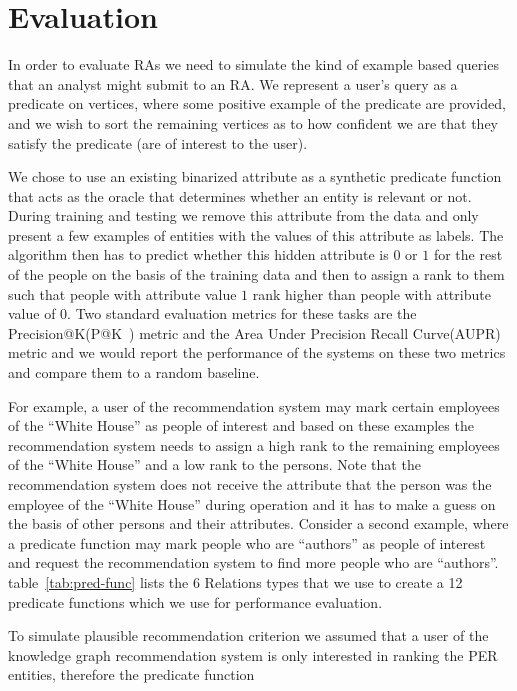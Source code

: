 \documentclass[paper=a4,fontsize=11pt]{scrartcl}
\makeatletter
\newcommand{\tabref}[1]{table~\ref{#1}}
\numberwithin{equation}{section}    %
\numberwithin{figure}{section}      %
\numberwithin{table}{section}       %
\newcommand{\PK}{P@K\ }
\makeatother
\begin{document}
\section{Evaluation}
\label{sec:evaluation}
In order to evaluate RAs we need to simulate the kind of example based queries
that an analyst might submit to an RA. We represent a user's query as a
predicate on vertices, where some positive example of the predicate are
provided, and we wish to sort the remaining vertices as to how confident we are
that they satisfy the predicate (are of interest to the user).

We chose to use an existing binarized attribute as a synthetic predicate function that
acts as the oracle that determines whether an entity is relevant or not.
During training and testing we remove this attribute from the data and
only present a few examples of entities with the values of this attribute as labels.
The algorithm then has to predict whether this hidden attribute is $0$ or $1$ for the
rest of the people on the basis of the training data and then to assign a rank to them
such that people with attribute value $1$ rank higher than people with attribute value of $0$.
Two standard evaluation metrics for these tasks are the {Precision@K}(\PK) metric and the
{Area Under Precision Recall Curve}(AUPR) metric and we would report the performance of the systems
on these two metrics and compare them to a random baseline.
\begin{example}\label{ex:eval}
    For example, a user of the recommendation system may mark certain employees of the
  ``White House'' as people of interest and based on these examples the recommendation
  system needs to assign a high rank to the remaining employees of the ``White House'' and
  a low rank to the persons. Note that the recommendation system does not receive the
  attribute that the person was the employee of the ``White House'' during operation
  and it has to make a guess on the basis of other persons and their attributes.
  Consider a second example, where a predicate function may mark people who are
  ``authors'' as people of interest and request the recommendation system to find more
  people who are ``authors''. \tabref{tab:pred-func} lists the 6 Relations types that we
  use to create a 12 predicate functions which we use for performance evaluation.
\end{example}
To simulate plausible recommendation criterion we assumed that
a user of the knowledge graph recommendation system is only
interested in ranking the \textsc{PER} entities, therefore the predicate function
\end{document}
